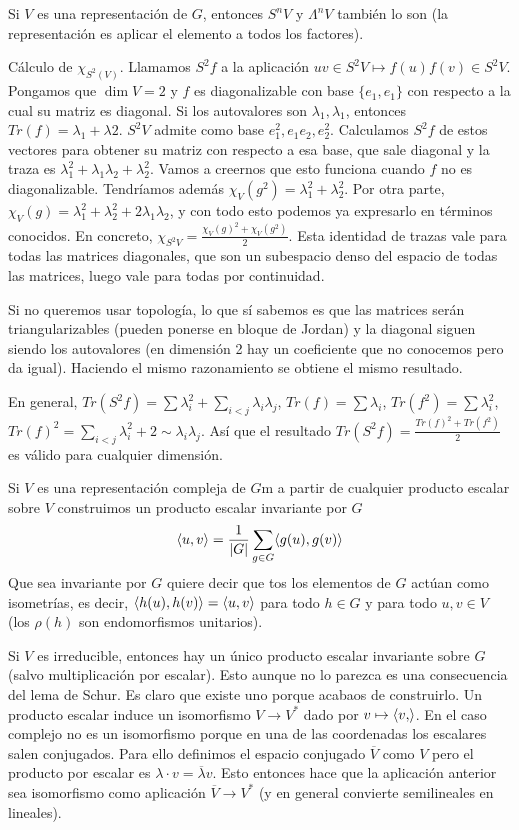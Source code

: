 \documentclass[ANAyTR.tex]{subfiles}
\begin{document}
Si $V$ es una representación de $G$, entonces $S^nV$ y $\Lambda^nV$ también lo son (la representación es aplicar el elemento a todos los factores).


Cálculo de $\chi_{S^2(V)}$. Llamamos $S^2f$ a la aplicación $uv\in S^2V\mapsto f(u)f(v)\in S^2V$. Pongamos que $\dim V=2$ y $f$ es diagonalizable con base $\{e_1,e_1\}$ con respecto a la cual su matriz es diagonal. Si los autovalores son $\lambda_1,\lambda_1$, entonces $Tr(f)=\lambda_1+\lambda2$. $S^2V$ admite como base $e_1^2, e_1e_2, e_2^2$. Calculamos $S^2f$ de estos vectores para obtener su matriz con respecto a esa base, que sale diagonal y la traza es $\lambda_1^2+\lambda_1\lambda_2+\lambda_2^2$. Vamos a creernos que esto funciona cuando $f$ no es diagonalizable. Tendríamos además $\chi_V(g^2)=\lambda_1^2+\lambda_2^2$. Por otra parte, $\chi_V(g)=\lambda_1^2+\lambda_2^2+2\lambda_1\lambda_2$, y con todo esto podemos ya expresarlo en términos conocidos. En concreto, $\chi_{S^2V}=\frac{\chi_V(g)^2+\chi_V(g^2)}{2}$. Esta identidad de trazas vale para todas las matrices diagonales, que son un subespacio denso del espacio de todas las matrices, luego vale para todas por continuidad. 

Si no queremos usar topología, lo que sí sabemos es que las matrices serán triangularizables (pueden ponerse en bloque de Jordan) y la diagonal siguen siendo los autovalores (en dimensión 2 hay un coeficiente que no conocemos pero da igual). Haciendo el mismo razonamiento se obtiene el mismo resultado.

En general, $Tr(S^2f)=\sum\lambda_i^2+\sum_{i<j}\lambda_i\lambda_j$, $Tr(f)=\sum\lambda_i$, $Tr(f^2)=\sum\lambda_i^2$, $Tr(f)^2=\sum_{i<j}\lambda_i^2+2\sim\lambda_i\lambda_j$. Así que el resultado $Tr(S^2f)=\frac{Tr(f)^2+Tr(f^2)}{2}$ es válido para cualquier dimensión. 

Si $V$ es una representación compleja de $G$m a partir de cualquier producto escalar sobre $V$ construimos un producto escalar invariante por $G$
\[
\langle{u,v}\rangle=\frac{1}{|G|}\sum_{g\in G}\langle{g(u),g(v)}\rangle
\]
Que sea invariante por $G$ quiere decir que tos los elementos de $G$ actúan como isometrías, es decir, $\langle{h(u),h(v)}\rangle=\langle{u,v}\rangle$ para todo $h\in G$ y para todo $u,v\in V$ (los $\rho(h)$ son endomorfismos unitarios). 

Si $V$ es irreducible, entonces hay un único producto escalar invariante sobre $G$ (salvo multiplicación por escalar). Esto aunque no lo parezca es una consecuencia del lema de Schur. Es claro que existe uno porque acabaos de construirlo. Un producto escalar induce un isomorfismo $V\to V^*$ dado por $v\mapsto \langle{v,}\rangle$. En el caso complejo no es un isomorfismo porque en una de las coordenadas los escalares salen conjugados. Para ello definimos el espacio conjugado $\overline{V}$ como $V$ pero el producto por escalar es $\lambda\cdot v=\overline{\lambda}v$. Esto entonces hace que la aplicación anterior sea isomorfismo como aplicación $\overline{V}\to V^*$ (y en general convierte semilineales en lineales).
\end{document}
